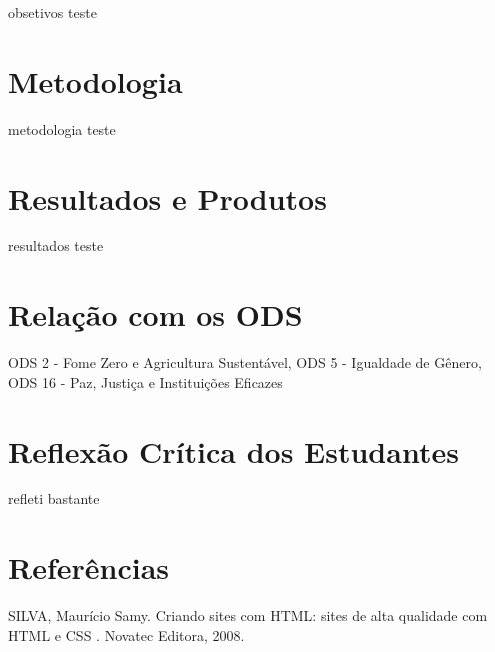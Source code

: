 \documentclass[12pt,a4paper]{article}
\begin{document}
obsetivos teste


\section*{Metodologia}

metodologia teste


\section*{Resultados e Produtos}

resultados teste


\section*{Relação com os ODS}

ODS 2 - Fome Zero e Agricultura Sustentável, ODS 5 - Igualdade de Gênero, ODS 16 - Paz, Justiça e Instituições Eficazes


\section*{Reflexão Crítica dos Estudantes}

refleti bastante


\section*{Referências}

SILVA, Maurício Samy. Criando sites com HTML: sites de alta qualidade com HTML e CSS . Novatec Editora, 2008.
\end{document}
